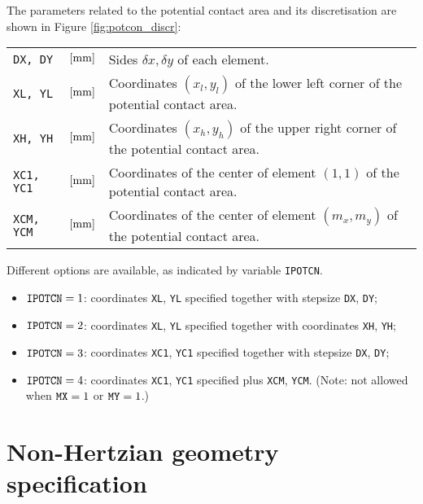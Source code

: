 \documentclass[12pt]{report}
\newenvironment{inputvars}{\vspace{0.4\baselineskip}%

\begin{tabular}{>{\raggedright}p{22mm}p{19mm}p{113mm}}}{
\end{tabular}

}
\newcommand{\inpvar}[3]{{\small\tt #1} & $#2$ & #3 \\[1ex]}
\begin{document}
The parameters related to the potential contact area and its discretisation
are shown in Figure \ref{fig:potcon_discr}:
\begin{inputvars}
\inpvar{DX, DY}{\bunit{mm}}{Sides $\delta x,\delta y$ of each element.}
\inpvar{XL, YL}{\bunit{mm}}{Coordinates $(x_l,y_l)$ of the lower left corner of
        the potential contact area.}
\inpvar{XH, YH}{\bunit{mm}}{Coordinates $(x_h,y_h)$ of the upper right corner of
        the potential contact area.}
\inpvar{XC1, YC1}{\bunit{mm}}{Coordinates of the center of element $(1,1)$
        of the potential contact area.}
\inpvar{XCM, YCM}{\bunit{mm}}{Coordinates of the center of element $(m_x,m_y)$
        of the potential contact area.}
\end{inputvars}
Different options are available, as indicated by variable {\tt IPOTCN}.
\begin{itemize}
\item ${\tt IPOTCN}=1$: coordinates {\tt XL}, {\tt YL} specified together
        with stepsize {\tt DX}, {\tt DY};
\item ${\tt IPOTCN}=2$: coordinates {\tt XL}, {\tt YL} specified together with
        coordinates {\tt XH}, {\tt YH};
\item ${\tt IPOTCN}=3$: coordinates {\tt XC1}, {\tt YC1} specified together
        with stepsize {\tt DX}, {\tt DY};
\item ${\tt IPOTCN}=4$: coordinates {\tt XC1}, {\tt YC1} specified plus
        {\tt XCM}, {\tt YCM}. (Note: not allowed when ${\tt MX}=1$ or ${\tt
        MY}=1$.)
\end{itemize}

\section{Non-Hertzian geometry specification}
\label{sec:ibase}
\end{document}
